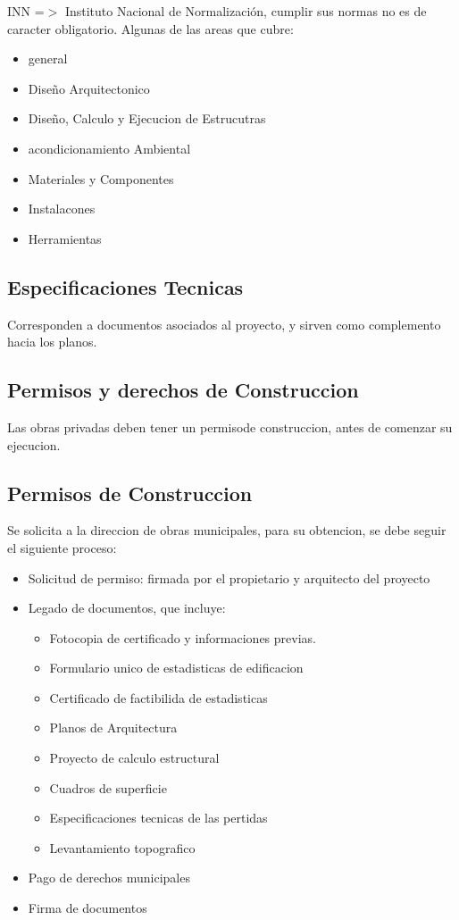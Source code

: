 \documentclass{article} %
\begin{document}
INN =$>$ Instituto Nacional de Normalización, cumplir sus normas no es de caracter obligatorio. Algunas de las areas que cubre:

\begin{itemize}
    \item general
    \item Diseño Arquitectonico
    \item Diseño, Calculo y Ejecucion de Estrucutras
    \item acondicionamiento Ambiental
    \item Materiales y Componentes
    \item Instalacones
    \item Herramientas
\end{itemize}

\subsection{Especificaciones Tecnicas}

Corresponden a documentos asociados al proyecto, y sirven como complemento hacia los planos.

\subsection{Permisos y derechos de Construccion}

Las obras privadas deben tener un permisode construccion, antes de comenzar su ejecucion.

\subsection{Permisos de Construccion}

Se solicita a la direccion de obras municipales, para su obtencion, se debe seguir el siguiente proceso:

\begin{itemize}
    \item Solicitud de permiso: firmada por el propietario y arquitecto del proyecto
    \item Legado de documentos, que incluye:
    \begin{itemize}
        \item Fotocopia de certificado y informaciones previas.
        \item Formulario unico de estadisticas de edificacion
        \item Certificado de factibilida de estadisticas
        \item Planos de Arquitectura
        \item Proyecto de calculo estructural
        \item Cuadros de superficie
        \item Especificaciones tecnicas de las pertidas
        \item Levantamiento topografico
    \end{itemize}
    \item Pago de derechos municipales
    \item Firma de documentos
\end{itemize}
\end{document}
